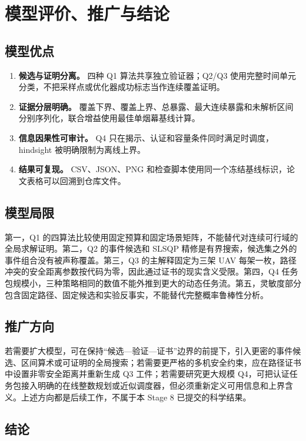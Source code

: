 \section{模型评价、推广与结论}

\subsection{模型优点}

\begin{enumerate}
  \item \textbf{候选与证明分离。} 四种 Q1 算法共享独立验证器；Q2/Q3 使用完整时间单元分类，不把采样点或优化器成功标志当作连续覆盖证明。
  \item \textbf{证据分层明确。} 覆盖下界、覆盖上界、总暴露、最大连续暴露和未解析区间分别序列化，联合增益使用最佳单烟幕基线计算。
  \item \textbf{信息因果性可审计。} Q4 只在揭示、认证和容量条件同时满足时调度，hindsight 被明确限制为离线上界。
  \item \textbf{结果可复现。} CSV、JSON、PNG 和检查脚本使用同一个冻结基线标识，论文表格可以回溯到仓库文件。
\end{enumerate}

\subsection{模型局限}

第一，Q1 的四算法比较使用固定预算和固定场景矩阵，不能替代对连续可行域的全局求解证明。第二，Q2 的事件候选和 SLSQP 精修是有界搜索，候选集之外的事件组合没有被声称覆盖。第三，Q3 的主解释固定为三架 UAV 每架一枚，路径冲突的安全距离参数按代码为零，因此通过证书的现实含义受限。第四，Q4 任务包规模小，三种策略相同的数值不能外推到更大的动态任务流。第五，灵敏度部分包含固定路径、固定候选和实验反事实，不能替代完整概率鲁棒性分析。

\subsection{推广方向}

若需要扩大模型，可在保持“候选—验证—证书”边界的前提下，引入更密的事件候选、区间算术或可证明的全局搜索；若需要更严格的多机安全约束，应在路径证书中设置非零安全距离并重新生成 Q3 工件；若需要研究更大规模 Q4，可把认证任务包接入明确的在线整数规划或近似调度器，但必须重新定义可用信息和上界含义。上述方向都是后续工作，不属于本 Stage 8 已提交的科学结果。

\subsection{结论}

